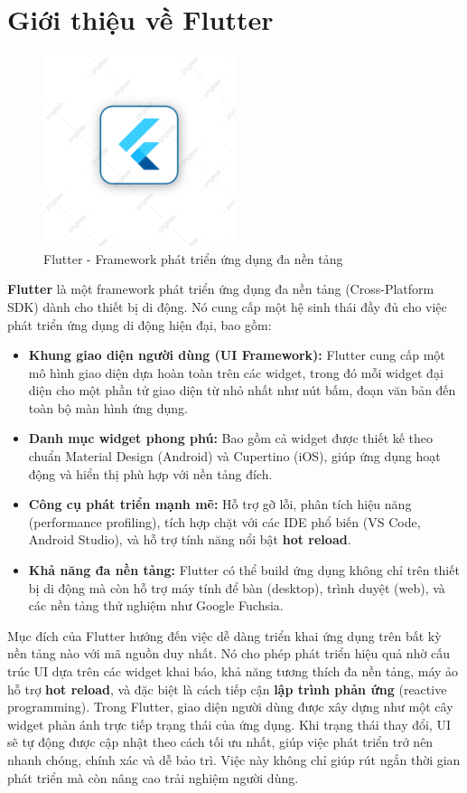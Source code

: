 \documentclass[../DoAn.tex]{subfiles}
\numberwithin{figure}{chapter}
\begin{document}
\section{Giới thiệu về Flutter}
\begin{figure}[H]
    \centering
    \includegraphics[width=0.5\textwidth]{Hinhve/flutterimg.png}
    \caption{Flutter - Framework phát triển ứng dụng đa nền tảng}
    \label{fig:flutterimg}
\end{figure}

\textbf{Flutter} là một framework phát triển ứng dụng đa nền
tảng (Cross-Platform SDK) dành cho thiết bị di động. Nó cung cấp một hệ sinh thái đầy đủ cho việc phát triển ứng dụng di động hiện đại, bao gồm:
\begin{itemize}
    \item \textbf{Khung giao diện người dùng (UI Framework):} Flutter cung cấp một mô hình giao diện dựa hoàn toàn trên các widget, trong đó mỗi widget đại diện cho một phần tử giao diện từ nhỏ nhất như nút bấm, đoạn văn bản đến toàn bộ màn hình ứng dụng.
    \item \textbf{Danh mục widget phong phú:} Bao gồm cả widget được thiết kế theo chuẩn Material Design (Android) và Cupertino (iOS), giúp ứng dụng hoạt động và hiển thị phù hợp với nền tảng đích.
    \item \textbf{Công cụ phát triển mạnh mẽ:} Hỗ trợ gỡ lỗi, phân tích hiệu năng (performance profiling), tích hợp chặt với các IDE phổ biến (VS Code, Android Studio), và hỗ trợ tính năng nổi bật \textbf{hot reload}.
    \item \textbf{Khả năng đa nền tảng:} Flutter có thể build ứng dụng không chỉ trên thiết bị di động mà còn hỗ trợ máy tính để bàn (desktop), trình duyệt (web), và các nền tảng thử nghiệm như Google Fuchsia.
\end{itemize}

Mục đích của Flutter hướng đến việc dễ dàng triển khai ứng dụng trên bất kỳ nền tảng nào với mã nguồn duy nhất. Nó cho phép phát triển hiệu quả nhờ cấu trúc UI dựa trên các widget khai báo, khả năng tương thích đa nền tảng, máy ảo hỗ trợ \textbf{hot reload}, và đặc biệt là cách tiếp cận \textbf{lập trình phản ứng} (reactive programming). Trong Flutter, giao diện người dùng được xây dựng như một cây widget phản ánh trực tiếp trạng thái của ứng dụng. Khi trạng thái thay đổi, UI sẽ tự động được cập nhật theo cách tối ưu nhất, giúp việc phát triển trở nên nhanh chóng, chính xác và dễ bảo trì. Việc này không chỉ giúp rút ngắn thời gian phát triển mà còn nâng cao trải nghiệm người dùng.
\end{document}
